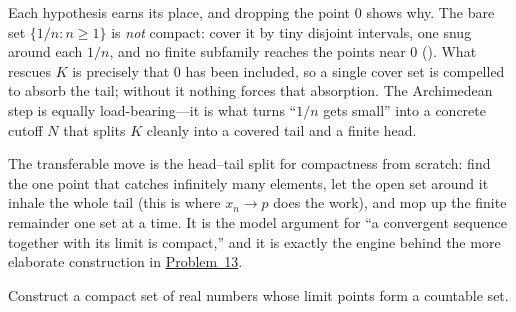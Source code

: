 \documentclass[main.tex]{subfiles}
\begin{document}
\begin{Reflection}
Each hypothesis earns its place, and dropping the point $0$ shows why. The bare set $\{1/n:n\ge 1\}$ is
\emph{not} compact: cover it by tiny disjoint intervals, one snug around each $1/n$, and no finite
subfamily reaches the points near $0$ (). What rescues $K$ is precisely that $0$ has been
included, so a single cover set is compelled to absorb the tail; without it nothing forces that
absorption. The Archimedean step is equally load-bearing---it is what turns ``$1/n$ gets small'' into a
concrete cutoff $N$ that splits $K$ cleanly into a covered tail and a finite head.

The transferable move is the head--tail split for compactness from scratch: find the one point that
catches infinitely many elements, let the open set around it inhale the whole tail (this is where
$x_n\to p$ does the work), and mop up the finite remainder one set at a time. It is the model argument
for ``a convergent sequence together with its limit is compact,'' and it is exactly the engine behind
the more elaborate construction in \hyperlink{prob:13}{Problem~13}.
\end{Reflection}

Construct a compact set of real numbers whose limit points form a countable set.
\end{document}
